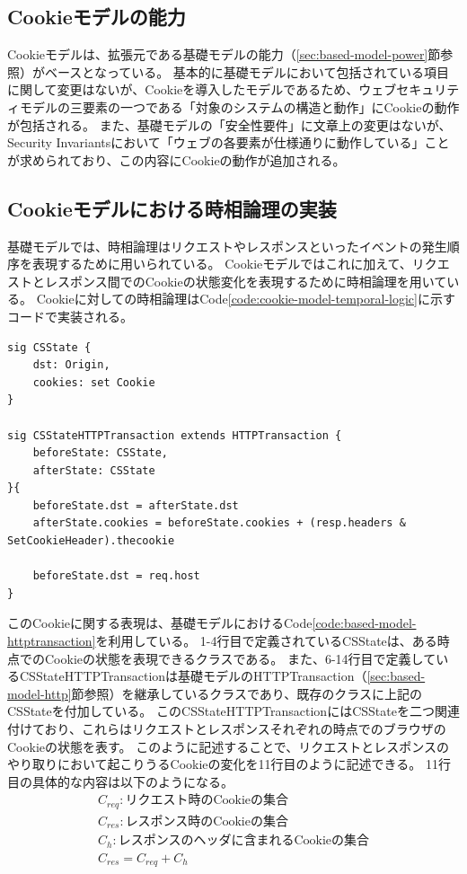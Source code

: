 \documentclass[12pt,a4paper]{jbook}
\begin{document}
\subsection{Cookieモデルの能力}
Cookieモデルは、拡張元である基礎モデルの能力（\ref{sec:based-model-power}節参照）がベースとなっている。
基本的に基礎モデルにおいて包括されている項目に関して変更はないが、Cookieを導入したモデルであるため、ウェブセキュリティモデルの三要素の一つである「対象のシステムの構造と動作」にCookieの動作が包括される。
また、基礎モデルの「安全性要件」に文章上の変更はないが、Security Invariantsにおいて「ウェブの各要素が仕様通りに動作している」ことが求められており、この内容にCookieの動作が追加される。

\subsection{Cookieモデルにおける時相論理の実装}
基礎モデルでは、時相論理はリクエストやレスポンスといったイベントの発生順序を表現するために用いられている。
Cookieモデルではこれに加えて、リクエストとレスポンス間でのCookieの状態変化を表現するために時相論理を用いている。
Cookieに対しての時相論理はCode\ref{code:cookie-model-temporal-logic}に示すコードで実装される。
\begin{lstlisting}[caption=Cookieに対する時相論理, label=code:cookie-model-temporal-logic]
sig CSState {
	dst: Origin,
	cookies: set Cookie
}

sig CSStateHTTPTransaction extends HTTPTransaction {
	beforeState: CSState,
	afterState: CSState
}{
	beforeState.dst = afterState.dst
	afterState.cookies = beforeState.cookies + (resp.headers & SetCookieHeader).thecookie
	
	beforeState.dst = req.host
}
\end{lstlisting}
\color{red}
このCookieに関する表現は、基礎モデルにおけるCode\ref{code:based-model-httptransaction}を利用している。
1-4行目で定義されているCSStateは、ある時点でのCookieの状態を表現できるクラスである。
また、6-14行目で定義しているCSStateHTTPTransactionは基礎モデルのHTTPTransaction（\ref{sec:based-model-http}節参照）を継承しているクラスであり、既存のクラスに上記のCSStateを付加している。
このCSStateHTTPTransactionにはCSStateを二つ関連付けており、これらはリクエストとレスポンスそれぞれの時点でのブラウザのCookieの状態を表す。
このように記述することで、リクエストとレスポンスのやり取りにおいて起こりうるCookieの変化を11行目のように記述できる。
11行目の具体的な内容は以下のようになる。
\begin{eqnarray}
C_{req}:\mbox{リクエスト時のCookieの集合} \nonumber\\
C_{res}:\mbox{レスポンス時のCookieの集合} \nonumber\\
C_{h}:\mbox{レスポンスのヘッダに含まれるCookieの集合} \nonumber\\
C_{res} = C_{req} + C_{h} \nonumber
\end{eqnarray}
\end{document}
